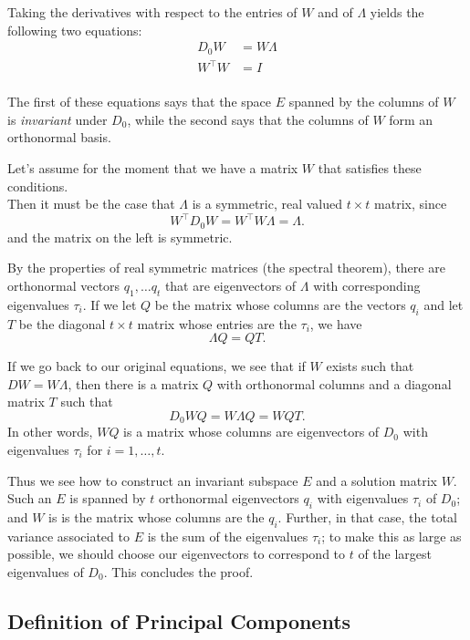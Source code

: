 \documentclass[
  11pt,
  letterpaper,
]{scrbook}
\theoremstyle{plain}
\theoremstyle{remark}
\begin{document}
Taking the derivatives with respect to the entries of \(W\) and of
\(\Lambda\) yields the following two equations: \begin{align*}
D_{0}W &= W\Lambda \\
W^{\intercal}W &= I \\
\end{align*}

The first of these equations says that the space \(E\) spanned by the
columns of \(W\) is \emph{invariant} under \(D_{0}\), while the second
says that the columns of \(W\) form an orthonormal basis.

Let's assume for the moment that we have a matrix \(W\) that satisfies
these conditions.\\
Then it must be the case that \(\Lambda\) is a symmetric, real valued
\(t\times t\) matrix, since \[
W^{\intercal}D_{0}W = W^{\intercal}W\Lambda = \Lambda.
\] and the matrix on the left is symmetric.

By the properties of real symmetric matrices (the spectral theorem),
there are orthonormal vectors \(q_{1},\ldots q_{t}\) that are
eigenvectors of \(\Lambda\) with corresponding eigenvalues \(\tau_{i}\).
If we let \(Q\) be the matrix whose columns are the vectors \(q_{i}\)
and let \(T\) be the diagonal \(t\times t\) matrix whose entries are the
\(\tau_{i}\), we have \[
\Lambda Q = QT.
\]

If we go back to our original equations, we see that if \(W\) exists
such that \(DW=W\Lambda\), then there is a matrix \(Q\) with orthonormal
columns and a diagonal matrix \(T\) such that \[
D_{0}WQ = W\Lambda Q = W Q T.
\] In other words, \(WQ\) is a matrix whose columns are eigenvectors of
\(D_{0}\) with eigenvalues \(\tau_{i}\) for \(i=1,\ldots, t\).

Thus we see how to construct an invariant subspace \(E\) and a solution
matrix \(W\). Such an \(E\) is spanned by \(t\) orthonormal eigenvectors
\(q_{i}\) with eigenvalues \(\tau_{i}\) of \(D_{0}\); and \(W\) is is
the matrix whose columns are the \(q_{i}\). Further, in that case, the
total variance associated to \(E\) is the sum of the eigenvalues
\(\tau_{i}\); to make this as large as possible, we should choose our
eigenvectors to correspond to \(t\) of the largest eigenvalues of
\(D_{0}\). This concludes the proof.

\hypertarget{definition-of-principal-components}{%
\subsection{Definition of Principal
Components}\label{definition-of-principal-components}}
\end{document}
